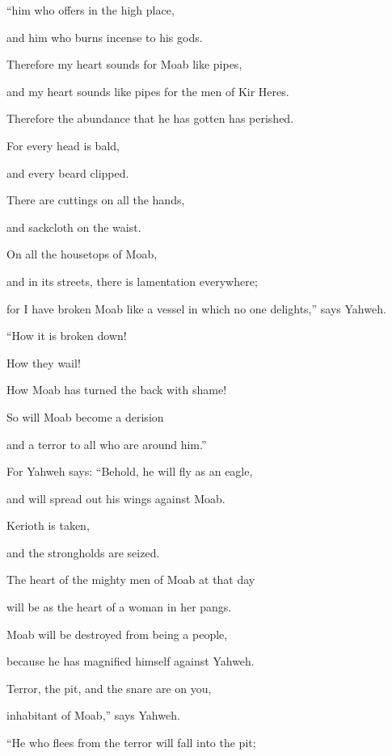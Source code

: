 {\par }{\QB “him who offers in the high place,
\par }{\QB and him who burns incense to his gods.
\par }{\Q {}Therefore my heart sounds for Moab like pipes,
\par }{\QB and my heart sounds like pipes for the men of Kir Heres.
\par }{\QB Therefore the abundance that he has gotten has perished.
\par }{\Q {}For every head is bald,
\par }{\QB and every beard clipped.
\par }{\Q There are cuttings on all the hands,
\par }{\QB and sackcloth on the waist.
\par }{\Q {}On all the housetops of Moab,
\par }{\QB and in its streets, there is lamentation everywhere;
\par }{\QB for I have broken Moab like a vessel in which no one delights,” says Yahweh.
\par }{\Q {}“How it is broken down!
\par }{\QB How they wail!
\par }{\Q How Moab has turned the back with shame!
\par }{\QB So will Moab become a derision
\par }{\QB and a terror to all who are around him.”
\par }{\Q {}For Yahweh says: “Behold, he will fly as an eagle,
\par }{\QB and will spread out his wings against Moab.
\par }{\Q {}Kerioth is taken,
\par }{\QB and the strongholds are seized.
\par }{\Q The heart of the mighty men of Moab at that day
\par }{\QB will be as the heart of a woman in her pangs.
\par }{\Q {}Moab will be destroyed from being a people,
\par }{\QB because he has magnified himself against Yahweh.
\par }{\Q {}Terror, the pit, and the snare are on you,
\par }{\QB inhabitant of Moab,” says Yahweh.
\par }{\Q {}“He who flees from the terror will fall into the pit;
}
